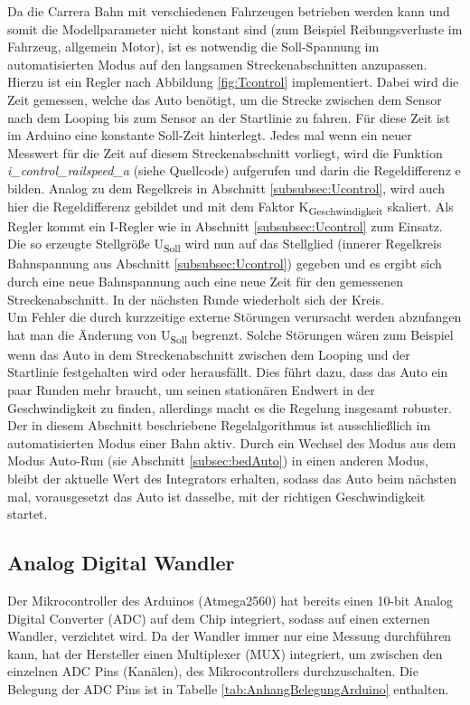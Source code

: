 \documentclass[a4paper, 11pt]{report}
\begin{document}
			Da die Carrera Bahn mit verschiedenen Fahrzeugen betrieben werden kann und somit die Modellparameter nicht konstant sind (zum Beispiel Reibungsverluste im Fahrzeug, allgemein Motor), ist es notwendig die Soll-Spannung im automatisierten Modus auf den langsamen Streckenabschnitten anzupassen. Hierzu ist ein Regler nach Abbildung \ref{fig:Tcontrol} implementiert. Dabei wird die Zeit gemessen, welche das Auto benötigt, um die Strecke zwischen dem Sensor nach dem Looping bis zum Sensor an der Startlinie zu fahren.
Für diese Zeit ist im Arduino eine konstante Soll-Zeit hinterlegt. Jedes mal wenn ein neuer Messwert für die Zeit auf diesem Streckenabschnitt vorliegt, wird die Funktion 
\emph{i\_control\_railspeed\_a}  (siehe Quellcode)  aufgerufen und darin die  Regeldifferenz \glqq e\grqq{} bilden. Analog zu dem Regelkreis in Abschnitt \ref{subsubsec:Ucontrol}, wird auch hier die Regeldifferenz gebildet und mit dem Faktor K\textsubscript{Geschwindigkeit} skaliert. Als Regler kommt ein I-Regler wie in Abschnitt \ref{subsubsec:Ucontrol} zum Einsatz. Die so erzeugte Stellgröße U\textsubscript{Soll} wird nun auf das Stellglied (innerer Regelkreis Bahnspannung aus Abschnitt \ref{subsubsec:Ucontrol}) gegeben und es ergibt sich durch eine neue Bahnspannung auch eine neue Zeit für den gemessenen Streckenabschnitt. In der nächsten Runde wiederholt sich der Kreis.\\
Um Fehler die durch kurzzeitige externe Störungen verursacht werden abzufangen hat man die Änderung von U\textsubscript{Soll} begrenzt.
Solche Störungen wären zum Beispiel wenn das Auto in dem Streckenabschnitt zwischen dem Looping und der Startlinie festgehalten wird oder herausfällt.
Dies führt dazu, dass das Auto ein paar Runden mehr braucht, um seinen stationären Endwert in der Geschwindigkeit zu finden, allerdings macht es die Regelung insgesamt robuster.
Der in diesem Abschnitt beschriebene Regelalgorithmus ist ausschließlich im automatisierten Modus einer Bahn aktiv.
Durch ein Wechsel des Modus aus dem Modus Auto-Run (sie Abschnitt \ref{subsec:bedAuto}) in einen anderen Modus, bleibt der aktuelle Wert des Integrators erhalten, sodass das Auto beim nächsten mal, vorausgesetzt das Auto ist dasselbe, mit der richtigen Geschwindigkeit startet.
		\FloatBarrier
	\newpage
	\subsection{Analog Digital Wandler}\label{subsec:ADC}

		Der Mikrocontroller des Arduinos (Atmega2560) hat bereits einen 10-bit Analog Digital Converter (ADC) auf dem Chip integriert, sodass auf einen externen Wandler, verzichtet wird.
		Da der Wandler immer nur eine Messung durchführen kann, hat der Hersteller einen Multiplexer (MUX) integriert, um zwischen den einzelnen ADC Pins (Kanälen), des Mikrocontrollers durchzuschalten.
		Die Belegung der ADC Pins ist in Tabelle \ref{tab:AnhangBelegungArduino} enthalten.
\end{document}
